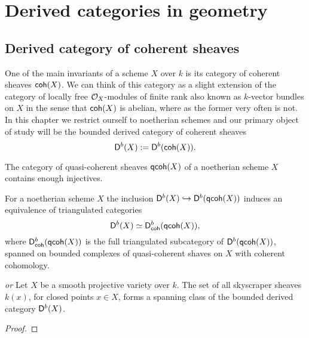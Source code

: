 \section{Derived categories in geometry}
\label{Derived categories in geometry}

\subsection{Derived category of coherent sheaves}

One of the main invariants of a scheme $X$ over $k$ is its category of coherent sheaves $\mathsf{coh}(X)$. We can think of this category as a slight extension of the category of locally free $\mathcal O_X$-modules of finite rank also known as $k$-vector bundles on $X$ in the sense that $\mathsf{coh}(X)$ is abelian, where as the former very often is not. In this chapter we restrict ourself to noetherian schemes and our primary object of study will be the bounded derived category of coherent sheaves
\[
    \mathsf{D}^b(X) := \mathsf{D}^b(\mathsf{coh}(X)).
\]

\begin{proposition}
    The category of quasi-coherent sheaves $\mathsf{qcoh}(X)$ of a noetherian scheme $X$ contains enough injectives.
\end{proposition}

\begin{proposition}
    For a noetherian scheme $X$ the inclusion $\mathsf{D}^b(X) \hookrightarrow \mathsf{D}^b(\mathsf{qcoh}(X))$ induces an equivalence of triangulated categories
    \[
        \mathsf{D}^b(X) \simeq \mathsf{D}^b_{\mathsf{coh}}(\mathsf{qcoh}(X)),
    \]
    where $\mathsf{D}^b_{\mathsf{coh}}(\mathsf{qcoh}(X))$ is the full triangulated subcategory of $\mathsf{D}^b(\mathsf{qcoh}(X))$, spanned on bounded complexes of quasi-coherent shaves on $X$ with coherent cohomology.
\end{proposition}

\begin{proposition}\emph{\cite[\S 3, Proposition 3.17]{huybrechts2006fouriermukai} or \cite[Example 2.2]{bridgeland2019equivalencestriangulatedcategoriesfouriermukai}}
    Let $X$ be a smooth projective variety over $k$. The set of all skyscraper sheaves $k(x)$, for closed points $x \in X$, forms a spanning class of the bounded derived category $\mathsf{D}^b(X)$.
\end{proposition}

\begin{proof}
    
\end{proof}

